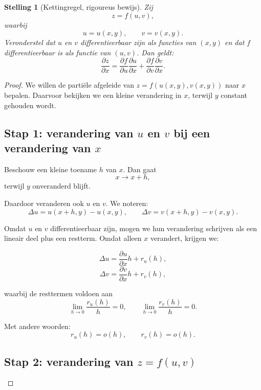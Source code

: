 \documentclass[11pt,a4paper]{article}
\newtheorem{theorem}{Stelling}[section]
\begin{document}
    \begin{theorem}[Kettingregel, rigoureus bewijs]
Zij
\[
    z=f(u,v),
\]
waarbij
\[
    u=u(x,y), \qquad v=v(x,y).
\]
Veronderstel dat $u$ en $v$ differentieerbaar zijn als functies van $(x,y)$
en dat $f$ differentieerbaar is als functie van $(u,v)$.
Dan geldt:
\[
    \frac{\partial z}{\partial x}
    =
    \frac{\partial f}{\partial u}\frac{\partial u}{\partial x}
    +
    \frac{\partial f}{\partial v}\frac{\partial v}{\partial x}.
\]
    \end{theorem}

    \begin{proof}
        We willen de partiële afgeleide van $z=f(u(x,y),v(x,y))$ naar $x$ bepalen.
        Daarvoor bekijken we een kleine verandering in $x$, terwijl $y$ constant
        gehouden wordt.

        \subsection*{Stap 1: verandering van $u$ en $v$ bij een verandering van $x$}

        Beschouw een kleine toename $h$ van $x$. Dan gaat
        \[
            x \to x+h,
        \]
        terwijl $y$ onveranderd blijft.

        Daardoor veranderen ook $u$ en $v$. We noteren:
        \[
            \Delta u = u(x+h,y)-u(x,y),
            \qquad
            \Delta v = v(x+h,y)-v(x,y).
        \]

        Omdat $u$ en $v$ differentieerbaar zijn, mogen we hun verandering schrijven
        als een lineair deel plus een restterm. Omdat alleen $x$ verandert, krijgen we:

        \[
            \Delta u
            =
            \frac{\partial u}{\partial x}h + r_u(h),
        \]
        \[
            \Delta v
            =
            \frac{\partial v}{\partial x}h + r_v(h),
        \]

        waarbij de resttermen voldoen aan
        \[
            \lim_{h\to0}\frac{r_u(h)}{h}=0,
            \qquad
            \lim_{h\to0}\frac{r_v(h)}{h}=0.
        \]

        Met andere woorden:
        \[
            r_u(h)=o(h),
            \qquad
            r_v(h)=o(h).
        \]

        \subsection*{Stap 2: verandering van $z=f(u,v)$}


\end{proof}
\end{document}
